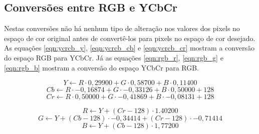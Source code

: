 \subsection{Conversões entre RGB e YCbCr}

Nestas conversões não há nenhum tipo de alteração nos valores dos pixels no espaço de cor original antes de convertê-los para pixels no espaço de cor desejado.
As equações \ref{eqn:ycrcb_y}, \ref{eqn:ycrcb_cb} e \ref{eqn:ycrcb_cr} mostram a conversão do espaço RGB para YCbCr.
Já as equações \ref{eqn:rgb_r}, \ref{eqn:rgb_g} e \ref{eqn:rgb_b} mostram a conversão do espaço YCbCr para RGB.

\begin{equation}
    \label{eqn:ycrcb_y}
    Y \xleftarrow{} R \cdot 0,29900 + G \cdot 0,58700 + B \cdot 0,11400
\end{equation}
\begin{equation}
    \label{eqn:ycrcb_cb}
    Cb \xleftarrow{} R \cdot -0,16874 + G \cdot -0,33126 + B \cdot 0,50000 + 128
\end{equation}
\begin{equation}
    \label{eqn:ycrcb_cr}
    Cr \xleftarrow{} R \cdot 0,50000 + G \cdot -0,41869 + B \cdot - 0,08131 + 128
\end{equation}

\begin{equation}
    \label{eqn:rgb_r}
    R \xleftarrow{} Y + (Cr - 128) \cdot 1.40200
\end{equation}
\begin{equation}
    \label{eqn:rgb_g}
    G \xleftarrow{} Y + (Cb - 128) \cdot -0,34414 + (Cr - 128) \cdot -0,71414
\end{equation}
\begin{equation}
    \label{eqn:rgb_b}
    B \xleftarrow{} Y + (Cb - 128) \cdot 1,77200
\end{equation}


